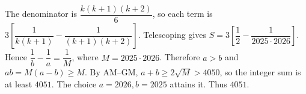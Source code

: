 The denominator is $\dfrac{k(k+1)(k+2)}{6}$, so each term is $3[\dfrac{1}{k(k+1)}-\dfrac{1}{(k+1)(k+2)}]$. Telescoping gives $S=3[\dfrac{1}{2}-\dfrac{1}{2025\cdot2026}]$. Hence $\dfrac{1}{b}-\dfrac{1}{a}=\dfrac{1}{M}$, where $M=2025\cdot2026$. Therefore $a>b$ and $ab=M(a-b)\ge M$. By AM--GM, $a+b\ge2\sqrt M>4050$, so the integer sum is at least $4051$. The choice $a=2026,b=2025$ attains it. Thus $\boxed{4051}$.
